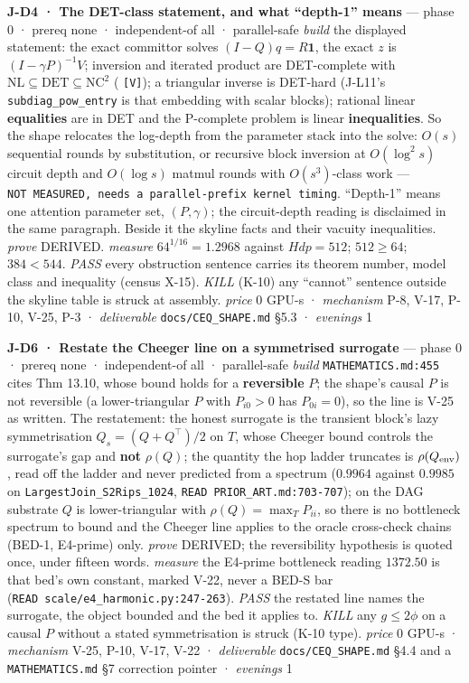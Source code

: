 \documentclass[11pt,a4paper]{article}
\newcounter{none}                 %
\theoremstyle{plain}
\theoremstyle{definition}
\theoremstyle{remark}
\begin{document}
\textbf{J-D4 · The DET-class statement, and what ``depth-1'' means} ---
phase 0 · prereq none · independent-of all · parallel-safe \emph{build}
the displayed statement: the exact committor solves
\((I-Q)q=R\mathbf 1\), the exact \(z\) is \((I-\gamma P)^{-1}V\);
inversion and iterated product are DET-complete with
\(\mathrm{NL}\subseteq\mathrm{DET}\subseteq\mathrm{NC}^2\)
(\citep{cook-1985-taxonomy} \texttt{{[}V{]}}); a triangular inverse is
DET-hard (J-L11's \texttt{subdiag\_pow\_entry} is that embedding with
scalar blocks); rational linear \textbf{equalities} are in DET and the
P-complete problem is linear \textbf{inequalities}. So the shape
relocates the log-depth from the parameter stack into the solve:
\(O(s)\) sequential rounds by substitution, or recursive block inversion
at \(O(\log^2 s)\) circuit depth and \(O(\log s)\) matmul rounds with
\(O(s^3)\)-class work ---
\texttt{NOT\ MEASURED,\ needs\ a\ parallel-prefix\ kernel\ timing}.
``Depth-1'' means one attention parameter set, \((P,\gamma)\); the
circuit-depth reading is disclaimed in the same paragraph. Beside it the
skyline facts and their vacuity inequalities. \emph{prove} DERIVED.
\emph{measure} \(64^{1/16}=1.2968\) against \(Hdp=512\); \(512\ge64\);
\(384<544\). \emph{PASS} every obstruction sentence carries its theorem
number, model class and inequality (census X-15). \emph{KILL} (K-10) any
``cannot'' sentence outside the skyline table is struck at assembly.
\emph{price} \(0\) GPU-s · \emph{mechanism} P-8, V-17, P-10, V-25, P-3 ·
\emph{deliverable} \texttt{docs/CEQ\_SHAPE.md} §5.3 · \emph{evenings} 1

\textbf{J-D6 · Restate the Cheeger line on a symmetrised surrogate} ---
phase 0 · prereq none · independent-of all · parallel-safe \emph{build}
\texttt{MATHEMATICS.md:455} cites \citep{levin-2017-markov-mixing} Thm
13.10, whose bound holds for a \textbf{reversible} \(P\); the shape's
causal \(P\) is not reversible (a lower-triangular \(P\) with
\(P_{i0}>0\) has \(P_{0i}=0\)), so the line is V-25 as written. The
restatement: the honest surrogate is the transient block's lazy
symmetrisation \(Q_s=(Q+Q^\top)/2\) on \(T\), whose Cheeger bound
controls the surrogate's gap and \textbf{not} \(\rho(Q)\); the quantity
the hop ladder truncates is \(\rho(Q_{\rm env})\), read off the ladder
and never predicted from a spectrum (\(0.9964\) against \(0.9985\) on
\texttt{LargestJoin\_S2Rips\_1024},
\texttt{READ\ PRIOR\_ART.md:703-707}); on the DAG substrate \(Q\) is
lower-triangular with \(\rho(Q)=\max_T P_{ii}\), so there is no
bottleneck spectrum to bound and the Cheeger line applies to the oracle
cross-check chains (BED-1, E4-prime) only. \emph{prove} DERIVED; the
reversibility hypothesis is quoted once, under fifteen words.
\emph{measure} the E4-prime bottleneck reading \(1372.50\) is that bed's
own constant, marked V-22, never a BED-S bar
(\texttt{READ\ scale/e4\_harmonic.py:247-263}). \emph{PASS} the restated
line names the surrogate, the object bounded and the bed it applies to.
\emph{KILL} any \(g\le2\phi\) on a causal \(P\) without a stated
symmetrisation is struck (K-10 type). \emph{price} \(0\) GPU-s ·
\emph{mechanism} V-25, P-10, V-17, V-22 · \emph{deliverable}
\texttt{docs/CEQ\_SHAPE.md} §4.4 and a \texttt{MATHEMATICS.md} §7
correction pointer · \emph{evenings} 1
\end{document}
